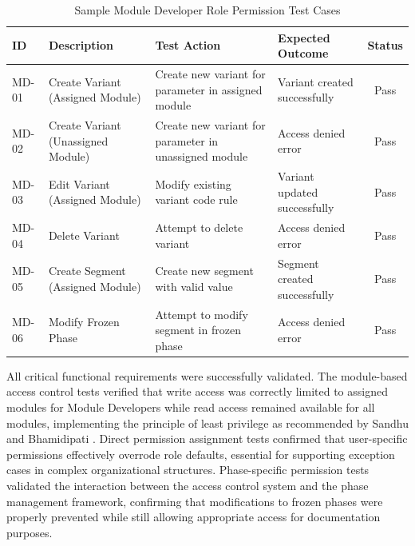 \begin{table}[H]
\centering
\caption{Sample Module Developer Role Permission Test Cases}
\label{tab:module-dev-test-cases}
\begin{tabular}{|p{0.7cm}|p{3.5cm}|p{3.7cm}|p{3.7cm}|c|}
\hline
\textbf{ID} & \textbf{Description} & \textbf{Test Action} & \textbf{Expected Outcome} & \textbf{Status} \\
\hline
MD-01 & Create Variant (Assigned Module) & Create new variant for parameter in assigned module & Variant created successfully & Pass \\
\hline
MD-02 & Create Variant (Unassigned Module) & Create new variant for parameter in unassigned module & Access denied error & Pass \\
\hline
MD-03 & Edit Variant (Assigned Module) & Modify existing variant code rule & Variant updated successfully & Pass \\
\hline
MD-04 & Delete Variant & Attempt to delete variant & Access denied error & Pass \\
\hline
MD-05 & Create Segment (Assigned Module) & Create new segment with valid value & Segment created successfully & Pass \\
\hline
MD-06 & Modify Frozen Phase & Attempt to modify segment in frozen phase & Access denied error & Pass \\
\hline
\end{tabular}
\end{table}

All critical functional requirements were successfully validated. The module-based access control tests verified that write access was correctly limited to assigned modules for Module Developers while read access remained available for all modules, implementing the principle of least privilege as recommended by Sandhu and Bhamidipati \cite{sandhu1997arbac97}. Direct permission assignment tests confirmed that user-specific permissions effectively overrode role defaults, essential for supporting exception cases in complex organizational structures. Phase-specific permission tests validated the interaction between the access control system and the phase management framework, confirming that modifications to frozen phases were properly prevented while still allowing appropriate access for documentation purposes.


